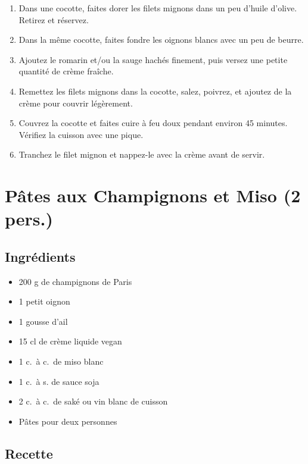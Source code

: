 \begin{enumerate}
\def\labelenumi{\arabic{enumi}.}

\item
  Dans une cocotte, faites dorer les filets mignons dans un peu d'huile
  d'olive. Retirez et réservez.
\item
  Dans la même cocotte, faites fondre les oignons blancs avec un peu de
  beurre.
\item
  Ajoutez le romarin et/ou la sauge hachés finement, puis versez une
  petite quantité de crème fraîche.
\item
  Remettez les filets mignons dans la cocotte, salez, poivrez, et
  ajoutez de la crème pour couvrir légèrement.
\item
  Couvrez la cocotte et faites cuire à feu doux pendant environ 45
  minutes. Vérifiez la cuisson avec une pique.
\item
  Tranchez le filet mignon et nappez-le avec la crème avant de servir.
\end{enumerate}

\section{Pâtes aux Champignons et Miso (2
pers.)}\label{puxe2tes-aux-champignons-et-miso-2-pers.}

\subsection{Ingrédients}\label{ingruxe9dients-7}

\begin{itemize}

\item
  200 g de champignons de Paris
\item
  1 petit oignon
\item
  1 gousse d'ail
\item
  15 cl de crème liquide vegan
\item
  1 c.~à c.~de miso blanc
\item
  1 c.~à s. de sauce soja
\item
  2 c.~à c.~de saké ou vin blanc de cuisson
\item
  Pâtes pour deux personnes
\end{itemize}

\subsection{Recette}\label{recette-5}

